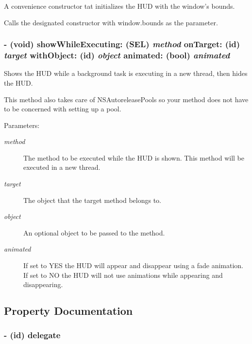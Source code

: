 A convenience constructor tat initializes the HUD with the window's bounds. 

Calls the designated constructor with window.bounds as the parameter. \hypertarget{interface_m_b_progress_h_u_d_57143873dfa8d273a17d378886b31cdb}{
\subsubsection[{showWhileExecuting:onTarget:withObject:animated:}]{\setlength{\rightskip}{0pt plus 5cm}- (void) showWhileExecuting: (SEL) {\em method}\/ onTarget: (id) {\em target}\/ withObject: (id) {\em object}\/ animated: (bool) {\em animated}}}
\label{interface_m_b_progress_h_u_d_57143873dfa8d273a17d378886b31cdb}


Shows the HUD while a background task is executing in a new thread, then hides the HUD. 

This method also takes care of NSAutoreleasePools so your method does not have to be concerned with setting up a pool.

\begin{Desc}
\item[Parameters:]
\begin{description}
\item[{\em method}]The method to be executed while the HUD is shown. This method will be executed in a new thread. \item[{\em target}]The object that the target method belongs to. \item[{\em object}]An optional object to be passed to the method. \item[{\em animated}]If set to YES the HUD will appear and disappear using a fade animation. If set to NO the HUD will not use animations while appearing and disappearing. \end{description}
\end{Desc}


\subsection{Property Documentation}
\hypertarget{interface_m_b_progress_h_u_d_f50bbbc26208854ae0af6f76bbab35d6}{
\subsubsection[{delegate}]{\setlength{\rightskip}{0pt plus 5cm}- (id) delegate}}
\label{interface_m_b_progress_h_u_d_f50bbbc26208854ae0af6f76bbab35d6}


